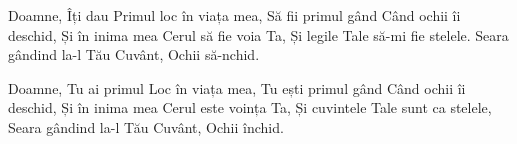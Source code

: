 
\beginverse
Doamne, Îți dau
Primul loc în viața mea,
Să fii primul gând
Când ochii îi deschid,
Și în inima mea
Cerul să fie voia Ta,
Și legile Tale să-mi fie stelele.
Seara gândind la-l Tău Cuvânt,
Ochii să-nchid.
\endverse

\beginverse
Doamne, Tu ai primul
Loc în viața mea,
Tu ești primul gând
Când ochii îi deschid,
Și în inima mea
Cerul este voința Ta,
Și cuvintele Tale sunt ca stelele,
Seara gândind la-l Tău Cuvânt,
Ochii închid.
\endverse

\endsong
